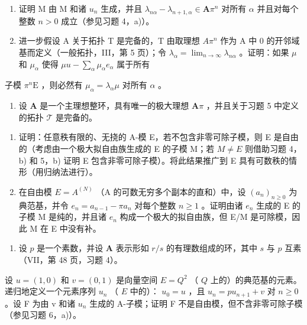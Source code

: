 \begin{enumerate}
\def\labelenumi{\alph{enumi})}
\item
  证明 M 由 M 和诸 \(u_{n}\) 生成，并且 \(\lambda_{n\alpha} - \lambda_{n + 1,\alpha} \in \mathbf{A}\pi^n\) 对所有 \(\alpha\) 并且对每个整数 \(n > 0\) 成立（参见习题 4，a)）。
\item
  进一步假设 A 关于拓扑 T 是完备的，T 由取理想 \(A\pi^{n}\) 作为 A 中 0 的开邻域基而定义（一般拓扑，III，第 5 页）；令 \(\lambda_{\alpha} = \lim_{n \to \infty} \lambda_{n\alpha}\) 。证明：如果 \(\mu\) 和 \(\mu_{\alpha}\) 使得 \(\mu u - \sum_{\alpha} \mu_{\alpha} e_{\alpha}\) 属于所有
\end{enumerate}

子模 \(\pi^n\mathrm{E}\) ，则必然有 \(\mu_{\alpha} = \lambda_{\alpha}\mu\) 对所有 \(\alpha\) 。

\begin{enumerate}
\def\labelenumi{\arabic{enumi})}
\setcounter{enumi}{5}
\tightlist
\item
  设 \(\mathbf{A}\) 是一个主理想整环，具有唯一的极大理想 \(\mathbf{A}\pi\) ，并且关于习题 5 中定义的拓扑 \(\mathcal{T}\) 是完备的。
\end{enumerate}

\begin{enumerate}
\def\labelenumi{\alph{enumi})}
\item
  证明：任意秩有限的、无挠的 A-模 E，若不包含非零可除子模，则 E 是自由的（考虑由一个极大拟自由族生成的 E 的子模 M；若 \(M \neq E\) 则借助习题 4，b) 和 5，b) 证明 E 包含非零可除子模）。将此结果推广到 E 具有可数秩的情形（用归纳法进行）。
\item
  在自由模 \(E = A^{(N)}\) （A 的可数无穷多个副本的直和）中，设 \((a_{n})_{n \geq 0}\) 为典范基，并令 \(e_{n} = a_{n-1} - \pi a_{n}\) 对每个整数 \(n \geq 1\) 。证明由诸 \(e_{n}\) 生成的 E 的子模 M 是纯的，并且诸 \(e_{n}\) 构成一个极大的拟自由族，但 E/M 是可除模，因此 M 在 E 中没有补。
\end{enumerate}

\begin{enumerate}
\def\labelenumi{\arabic{enumi})}
\setcounter{enumi}{6}
\tightlist
\item
  设 \(p\) 是一个素数，并设 \(\mathbf{A}\) 表示形如 \(r / s\) 的有理数组成的环，其中 \(s\) 与 \(p\) 互素（VII，第 48 页，习题 4）。
\end{enumerate}

设 \(u = (1,0)\) 和 \(v = (0,1)\) 是向量空间 \(E = Q^2\) （ \(Q\) 上的）的典范基的元素。递归地定义一个元素序列 \(u_n\) （ \(E\) 中的）： \(u_0 = u\) ，且 \(u_{n}=pu_{n+1}+v\) 对 \(n\geqslant0\) 。设 F 为由 v 和诸 \(u_{n}\) 生成的 A-子模；证明 F 不是自由模，但不含非零可除子模（参见习题 6，a)）。

